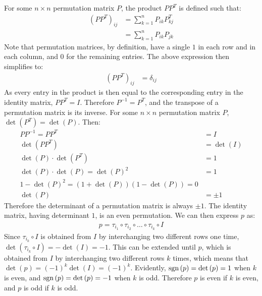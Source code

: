 \documentclass{article}
\begin{document}
\problem
{}
For some $n \times n$ permutation matrix $P$, the product $PP^T$ is defined such that:
\begin{equation}
    \begin{split}
        \left(PP^T\right)_{ij} & = \sum_{k=1}^n P_{ik}P^T_{kj} \\
        & = \sum_{k=1}^n P_{ik}P_{jk}
    \end{split}
\end{equation}
Note that permutation matrices, by definition, have a single $1$ in each row and in each column, and $0$ for the remaining entries. The above expression then simplifies to:
\begin{equation}
    \begin{split}
        \left(PP^T\right)_{ij} & = \delta_{ij}
    \end{split}
\end{equation}
As every entry in the product is then equal to the corresponding entry in the identity matrix, $PP^T = I$. Therefore $P^{-1} = P^T$, and the transpose of a permutation matrix is its inverse.
For some $n \times n$ permutation matrix $P$, $\det\left(P^T\right) = \det\left(P\right)$.
Then:
\begin{equation}
    \begin{split}
        PP^{-1} = PP^T & = I \\
        \det\left(PP^T\right) & = \det\left(I\right) \\
        \det\left(P\right) \cdot \det\left(P^T\right) & = 1 \\
        \det\left(P\right) \cdot \det\left(P\right) = \det\left(P\right)^2 & = 1 \\
        1 - \det\left(P\right)^2 = \left(1 + \det\left(P\right)\right)\left(1 - \det\left(P\right)\right) = 0 \\
        \det\left(P\right) & = \pm 1
    \end{split}
\end{equation}
Therefore the determinant of a permutation matrix is always $\pm 1$.
The identity matrix, having determinant $1$, is an even permutation.  We can then express $p$ as:
\begin{equation}
    \begin{split}
        p = \tau_{i_1} \circ \tau_{i_2} \circ \ldots \circ \tau_{i_k} \circ I
    \end{split}
\end{equation}
Since $\tau_{i_k} \circ I$ is obtained from $I$ by interchanging two different rows one time, $\det\left(\tau_{i_k} \circ I\right) = -\det\left(I\right) = -1$. This can be extended until $p$, which is obtained from $I$ by interchanging two different rows $k$ times, which means that $\det\left(p\right) = \left(-1\right)^k\det\left(I\right) = \left(-1\right)^k$. Evidently, $\operatorname{sgn}\left(p\right) = \det\left(p\right) = 1$ when $k$ is even, and $\operatorname{sgn}\left(p\right) = \det\left(p\right) = -1$ when $k$ is odd. Therefore $p$ is even if $k$ is even, and $p$ is odd if $k$ is odd.
\end{document}
